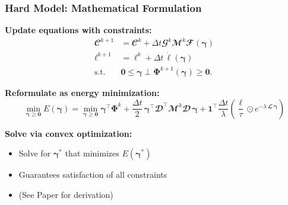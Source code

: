 \documentclass[10pt,t]{beamer}
\begin{document}
\begin{frame}
    \frametitle{Hard Model: Mathematical Formulation}

    \textbf{Update equations with constraints:}
    \begin{equation} \label{eq:colony_update_with_constraints}
        \begin{split}
            \mathbfcal{C}^{k+1} & = \mathbfcal{C}^k + \Delta t \mathbfcal{G}^k \mathbfcal{M}^k \mathbfcal{F}(\boldsymbol{\gamma})  \\
            \boldsymbol{\ell}^{k+1} & = \boldsymbol{\ell}^k + \Delta t \, \dot{\boldsymbol{\ell}}(\boldsymbol{\gamma}) \\
            \text{s.t.} \quad & \mathbf{0} \leq \boldsymbol{\gamma} \perp \boldsymbol{\Phi}^{k+1}(\boldsymbol{\gamma}) \geq \mathbf{0}.
        \end{split}
    \end{equation}

    \textbf{Reformulate as energy minimization:}
    \begin{equation*} \label{eq:energy_function}
        \min_{\boldsymbol{\gamma} \geq \mathbf{0}}
        E(\boldsymbol{\gamma})
        = \min_{\boldsymbol{\gamma} \geq \mathbf{0}} \boldsymbol{\gamma}^\top \boldsymbol{\Phi}^k
        +  \frac{\Delta t}{2}\, \boldsymbol{\gamma}^\top \mathbfcal{D}^\top \mathbfcal{M}^k \mathbfcal{D}\, \boldsymbol{\gamma}
        + \mathbf{1}^\top \frac{\Delta t}{\lambda}
        \left( \frac{\boldsymbol{\ell}}{\tau} \odot e^{-\lambda\, \mathbfcal{L}\, \boldsymbol{\gamma}} \right)
    \end{equation*}

    \vspace{0.3cm}

    \textbf{Solve via convex optimization:}
    \begin{itemize}
        \item Solve for $\boldsymbol{\gamma}^{*}$ that minimizes $E(\boldsymbol{\gamma}^{*} )$
        \item Guarantees satisfaction of all constraints
        \item (See Paper for derivation)
    \end{itemize}


\end{frame}
\end{document}
